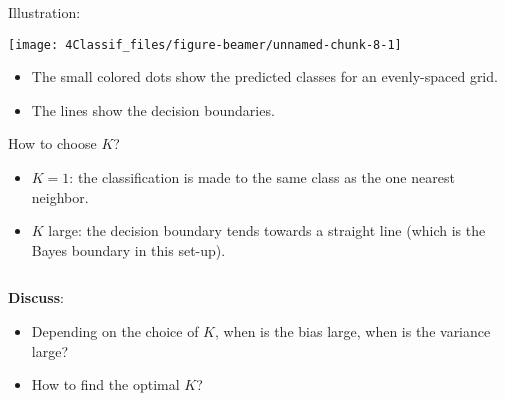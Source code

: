 \documentclass[10pt,ignorenonframetext,]{beamer}
\providecommand{\tightlist}{%
  \setlength{\itemsep}{0pt}\setlength{\parskip}{0pt}}
\begin{document}
\begin{frame}

Illustration:

\begin{center}\texttt{[image: 4Classif\_files/figure-beamer/unnamed-chunk-8-1]} \end{center}

\vspace{2mm}

\scriptsize

\begin{itemize}
\tightlist
\item
  The small colored dots show the predicted classes for an evenly-spaced
  grid.
\item
  The lines show the decision boundaries.
\end{itemize}

\end{frame}

\begin{frame}

\begin{block}{How to choose \(K\)?}

\vspace{2mm}

\begin{itemize}
\tightlist
\item
  \(K=1\): the classification is made to the same class as the one
  nearest neighbor.
\end{itemize}

\vspace{2mm}

\begin{itemize}
\tightlist
\item
  \(K\) large: the decision boundary tends towards a straight line
  (which is the Bayes boundary in this set-up).
\end{itemize}

\vspace{2mm}

\(~\)

\textbf{Discuss}:

\vspace{2mm}

\begin{itemize}
\tightlist
\item
  Depending on the choice of \(K\), when is the bias large, when is the
  variance large?
\end{itemize}

\vspace{2mm}

\begin{itemize}
\tightlist
\item
  How to find the optimal \(K\)?
\end{itemize}

\end{block}

\end{frame}
\end{document}
